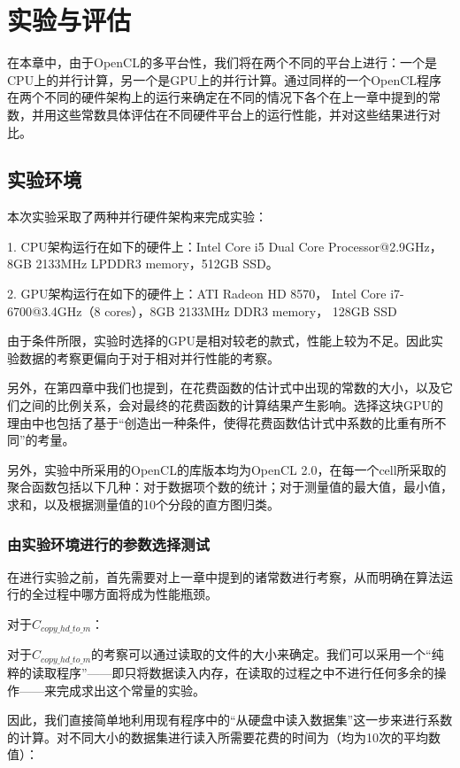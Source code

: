 \chapter{实验与评估}


在本章中，由于OpenCL的多平台性，我们将在两个不同的平台上进行：一个是CPU上的并行计算，另一个是GPU上的并行计算。通过同样的一个OpenCL程序在两个不同的硬件架构上的运行来确定在不同的情况下各个在上一章中提到的常数，并用这些常数具体评估在不同硬件平台上的运行性能，并对这些结果进行对比。

\section{实验环境}
本次实验采取了两种并行硬件架构来完成实验：

1. CPU架构运行在如下的硬件上：Intel Core i5 Dual Core Processor@2.9GHz，8GB 2133MHz LPDDR3 memory，512GB SSD。

2. GPU架构运行在如下的硬件上：ATI Radeon HD 8570， Intel Core i7-6700@3.4GHz（8 cores），8GB 2133MHz DDR3 memory， 128GB SSD

由于条件所限，实验时选择的GPU是相对较老的款式，性能上较为不足。因此实验数据的考察更偏向于对于相对并行性能的考察。

另外，在第四章中我们也提到，在花费函数的估计式中出现的常数的大小，以及它们之间的比例关系，会对最终的花费函数的计算结果产生影响。选择这块GPU的理由中也包括了基于“创造出一种条件，使得花费函数估计式中系数的比重有所不同”的考量。

另外，实验中所采用的OpenCL的库版本均为OpenCL 2.0，在每一个cell所采取的聚合函数包括以下几种：对于数据项个数的统计；对于测量值的最大值，最小值，求和，以及根据测量值的10个分段的直方图归类。

\subsection{由实验环境进行的参数选择测试}
在进行实验之前，首先需要对上一章中提到的诸常数进行考察，从而明确在算法运行的全过程中哪方面将成为性能瓶颈。

对于$C_{copy\_hd\_to\_m}$：

对于$C_{copy\_hd\_to\_m}$的考察可以通过读取的文件的大小来确定。我们可以采用一个“纯粹的读取程序”——即只将数据读入内存，在读取的过程之中不进行任何多余的操作——来完成求出这个常量的实验。

因此，我们直接简单地利用现有程序中的“从硬盘中读入数据集”这一步来进行系数的计算。对不同大小的数据集进行读入所需要花费的时间为（均为10次的平均数值）：

